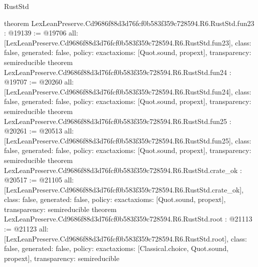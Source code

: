 \begin{lexlean}{RustStd}
\begin{coremodule}
{}
theorem LexLeanPreserve.Cd9686f88d3d76fcf0b583f359c728594.R6.RustStd.fun23 : @19139 := @19706 {
  all: [LexLeanPreserve.Cd9686f88d3d76fcf0b583f359c728594.R6.RustStd.fun23],
  class: false,
  generated: false,
  policy: exact{axioms: [Quot.sound, propext]},
  transparency: semireducible
}
theorem LexLeanPreserve.Cd9686f88d3d76fcf0b583f359c728594.R6.RustStd.fun24 : @19707 := @20260 {
  all: [LexLeanPreserve.Cd9686f88d3d76fcf0b583f359c728594.R6.RustStd.fun24],
  class: false,
  generated: false,
  policy: exact{axioms: [Quot.sound, propext]},
  transparency: semireducible
}
theorem LexLeanPreserve.Cd9686f88d3d76fcf0b583f359c728594.R6.RustStd.fun25 : @20261 := @20513 {
  all: [LexLeanPreserve.Cd9686f88d3d76fcf0b583f359c728594.R6.RustStd.fun25],
  class: false,
  generated: false,
  policy: exact{axioms: [Quot.sound, propext]},
  transparency: semireducible
}
theorem LexLeanPreserve.Cd9686f88d3d76fcf0b583f359c728594.R6.RustStd.crate_ok : @20517 := @21105 {
  all: [LexLeanPreserve.Cd9686f88d3d76fcf0b583f359c728594.R6.RustStd.crate_ok],
  class: false,
  generated: false,
  policy: exact{axioms: [Quot.sound, propext]},
  transparency: semireducible
}
theorem LexLeanPreserve.Cd9686f88d3d76fcf0b583f359c728594.R6.RustStd.root : @21113 := @21123 {
  all: [LexLeanPreserve.Cd9686f88d3d76fcf0b583f359c728594.R6.RustStd.root],
  class: false,
  generated: false,
  policy: exact{axioms: [Classical.choice, Quot.sound, propext]},
  transparency: semireducible
}


\end{coremodule}
\end{lexlean}

